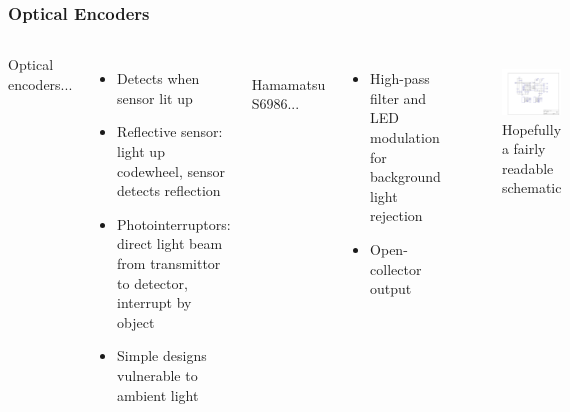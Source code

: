 \documentclass{beamer}
\begin{document}
\begin{frame}
\frametitle{Optical Encoders}
\begin{columns}[t]
Optical encoders...
\begin{itemize}
  \item Detects when sensor lit up
  \item Reflective sensor: light up codewheel, sensor detects reflection
  \item Photointerruptors: direct light beam from transmittor to detector, interrupt by object
  \item Simple designs vulnerable to ambient light
\end{itemize}

\hfill \\
Hamamatsu S6986...
\begin{itemize}
  \item High-pass filter and LED modulation for background light rejection
  \item Open-collector output
\end{itemize}

\begin{figure}
  \centering
  \includegraphics[width=1.0\columnwidth]{images-dis5/mc33883-schematic} \\
  Hopefully a fairly readable schematic
\end{figure}
\end{columns}
\end{frame}
\end{document}
